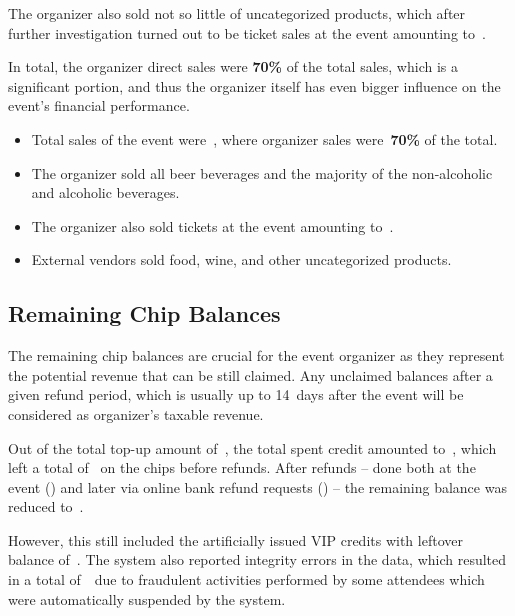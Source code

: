 The organizer also sold not so little of uncategorized products, which after further investigation turned out to be ticket sales at the event amounting to~.

In total, the organizer direct sales were \textbf{70\%} of the total sales, which is a significant portion, and thus the organizer itself has even bigger influence on the event's financial performance.

\begin{keytakeaways}
	\begin{itemize}
		\item Total sales of the event were~, where organizer sales were~\textbf{70\%} of the total.
		\item The organizer sold all beer beverages and the majority of the non-alcoholic and alcoholic beverages.
		\item The organizer also sold tickets at the event amounting to~.
		\item External vendors sold food, wine, and other uncategorized products.
	\end{itemize}
\end{keytakeaways}



\subsection{Remaining Chip Balances}
\label{subsec:analysis-remaining-balances}

The remaining chip balances are crucial for the event organizer as they represent the potential revenue that can be still claimed.
Any unclaimed balances after a given refund period, which is usually up to 14~days after the event will be considered as organizer's taxable revenue.

Out of the total top-up amount of~, the total spent credit amounted to~, which left a total of~ on the chips before refunds.
After refunds – done both at the event () and later via online bank refund requests () – the remaining balance was reduced to~.

However, this still included the artificially issued VIP credits with leftover balance of~.
The system also reported integrity errors in the data, which resulted in a total of~~due to fraudulent activities performed by some attendees which were automatically suspended by the system.

